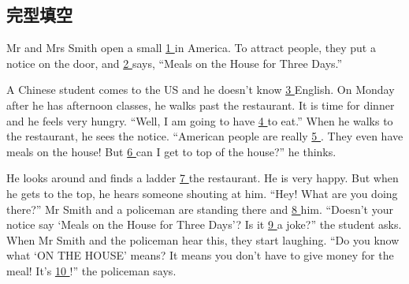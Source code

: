 \subsection{完型填空}
\item{
    Mr and Mrs Smith open a small \underline{ 1 } in America. To attract people, they put a notice on the door, and \underline{ 2 } says, ``Meals on the House for Three Days.''

    \hspace{2em} 
    A Chinese student comes to the US and he doesn't know \underline{ 3 } English. On Monday after he has afternoon classes, he walks past the restaurant. It is time for dinner and he feels very hungry. ``Well, I am going to have \underline{ 4 } to eat.'' When he walks to the restaurant, he sees the notice. ``American people are really \underline{ 5 }. They even have meals on the house! But \underline{ 6 } can I get to top of the house?'' he thinks.

    \hspace{2em} 
    He looks around and finds a ladder \underline{ 7 } the restaurant. He is very happy. But when he gets to the top, he hears someone shouting at him. ``Hey! What are you doing there?'' Mr Smith and a policeman are standing there and \underline{ 8 } him. ``Doesn't your notice say `Meals on the House for Three Days'? Is it \underline{ 9 } a joke?'' the student asks. When Mr Smith and the policeman hear this, they start laughing. ``Do you know what `ON THE HOUSE' means? It means you don't have to give money for the meal! It's \underline{ 10 }!'' the policeman says.

}
